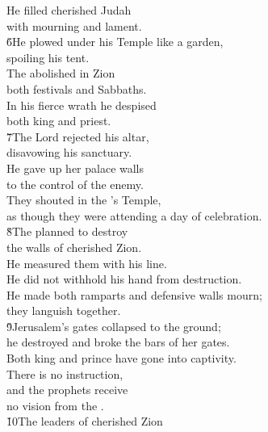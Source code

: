 \begin{poetry}
\poeml He filled cherished Judah \\
\poemll    with mourning and lament. \\
\poeml \v{6}He plowed under his Temple like a garden, \\
\poemll    spoiling his tent. \\
\poeml The  abolished in Zion \\
\poemll    both festivals and Sabbaths. \\
\poeml In his fierce wrath he despised \\
\poemll    both king and priest. \\
\poeml \v{7}The Lord rejected his altar, \\
\poemll    disavowing his sanctuary. \\
\poeml He gave up her palace walls \\
\poemll    to the control of the enemy. \\
\poeml They shouted in the 's Temple, \\
\poemll    as though they were attending a day of celebration. \\
\poeml \v{8}The  planned to destroy \\
\poemll    the walls of cherished Zion. \\
\poeml He measured them with his line. \\
\poemll    He did not withhold his hand from destruction. \\
\poeml He made both ramparts and defensive walls mourn; \\
\poemll    they languish together. \\
\poeml \v{9}Jerusalem's gates collapsed to the ground; \\
\poemll    he destroyed and broke the bars of her gates. \\
\poeml Both king and prince have gone into captivity. \\
\poemll    There is no instruction, \\
\poeml and the prophets receive \\
\poemll    no vision from the . \\
\poeml \v{10}The leaders of cherished Zion \\

\end{poetry}
